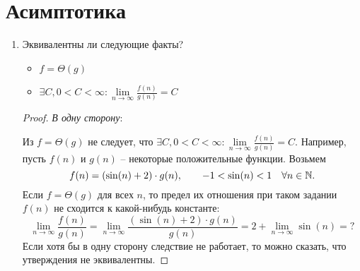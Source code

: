 \section{Асимптотика}
\begin{enumerate}
  \item	
	Эквивалентны ли следующие факты?
	\begin{itemize}
		\item $f = \Theta(g)$
		\item $\exists C,  0 < C < \infty : \lim\limits_{n \to \infty} \frac{f(n)}{g(n)} = C$
	\end{itemize}

  \begin{proof}
    \textit{В одну сторону}:

    Из $f = \Theta(g)$ не следует, что $\exists C,  0 < C < \infty : \lim\limits_{n \to \infty} \frac{f(n)}{g(n)} = C$.
    Например, пусть $f(n)$ и $g(n)$ -- некоторые положительные функции. Возьмем
    \begin{equation}
      f(n) = (\sin(n) + 2)\cdot g(n), \qquad -1 < \sin(n) < 1 \quad \forall n \in \mathbb{N}.
    \end{equation}
    Если $f = \Theta(g)$ для всех $n$, то предел их отношения при таком задании $f(n)$ не сходится к какой-нибудь константе:
    \begin{equation}
      \lim\limits_{n \to \infty} \frac{f(n)}{g(n)} = \lim\limits_{n \to \infty} \frac{(\sin(n) + 2)\cdot g(n)}{g(n)} = 2 + \lim\limits_{n \to \infty} \sin(n) = ?
    \end{equation}
    Если хотя бы в одну сторону следствие не работает, то можно сказать, что утверждения не эквивалентны.


\end{proof}
\end{enumerate}

